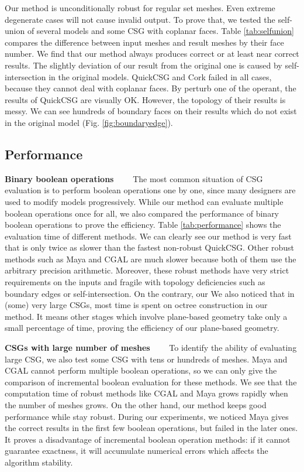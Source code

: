 \documentclass[10pt,journal,compsoc]{IEEEtran}
\begin{document}
Our method is unconditionally robust for regular set meshes. Even extreme degenerate cases will not cause invalid output. To prove that, we tested the self-union of several models and some CSG with coplanar faces. Table \ref{tab:selfunion} compares the difference between input meshes and result meshes by their face number. We find that our method always produces correct or at least near correct results. The slightly deviation of our result from the original one is caused by self-intersection in the original models. QuickCSG and Cork failed in all cases, because they cannot deal with coplanar faces. By perturb one of the operant, the results of QuickCSG are visually OK. However, the topology of their results is messy. We can see hundreds of boundary faces on their results which do not exist in the original model (Fig. \ref{fig:boundaryedge}).


\subsection{Performance}
\vspace{0.5em}
\noindent\textbf{Binary boolean operations}~~~~
The most common situation of CSG evaluation is to perform boolean operations one by one, since many designers are used to modify models progressively. While our method can evaluate multiple boolean operations once for all, we also compared the performance of binary boolean operations to prove the efficiency. Table \ref{tab:performance} shows the evaluation time of different methods. We can clearly see our method is very fast that is only twice as slower than the fastest non-robust QuickCSG. Other robust methods such as Maya and CGAL are much slower because both of them use the arbitrary precision arithmetic. Moreover, these robust methods have very strict requirements on the inputs and fragile with topology deficiencies such as boundary edges or self-intersection. On the contrary, our   We also noticed that in (some) very large CSGs, most time is spent on octree construction in our method. It means other stages which involve plane-based geometry take only a small percentage of time, proving the efficiency of our plane-based geometry.


\vspace{0.5em}
\noindent\textbf{CSGs with large number of meshes}~~~~
To identify the ability of evaluating large CSG, we also test some CSG with tens or hundreds of meshes. Maya and CGAL cannot perform multiple boolean operations, so we can only give the comparison of incremental boolean evaluation for these methods. We see that the computation time of robust methods like CGAL and Maya grows rapidly when the number of meshes grows. On the other hand, our method keeps good performance while stay robust. During our experiments, we noticed Maya gives the correct results in the first few boolean operations, but failed in the later ones. It proves a disadvantage of incremental boolean operation methods: if it cannot guarantee exactness, it will accumulate numerical errors which affects the algorithm stability.
\end{document}
